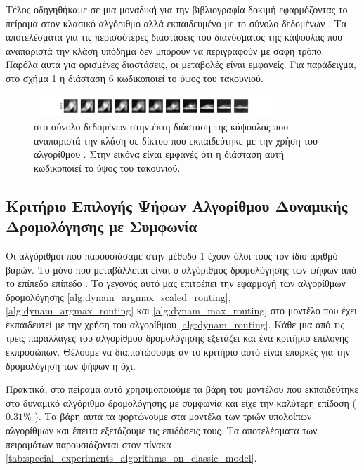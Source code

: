 Τέλος οδηγηθήκαμε σε μια μοναδική για την βιβλιογραφία δοκιμή εφαρμόζοντας το πείραμα στον κλασικό αλγόριθμο αλλά εκπαιδευμένο με το σύνολο δεδομένων . Τα αποτελέσματα για τις περισσότερες διαστάσεις του διανύσματος της κάψουλας που αναπαριστά την κλάση υπόδημα δεν μπορούν να περιγραφούν με σαφή τρόπο. Παρόλα αυτά για ορισμένες διαστάσεις, οι μεταβολές είναι εμφανείς. Για παράδειγμα, στο σχήμα \ref{fig:exp_method_1_special_perturb_4} η διάσταση 6 κωδικοποιεί το ύψος του τακουνιού.
\begin{figure}[h]
    \centering
    \includegraphics[width=0.8\textwidth]{images/chapter experiments/method 1/image 9/perturbations_11_sixth_dim.png}
    \caption{ στο σύνολο δεδομένων  στην έκτη διάσταση της κάψουλας  που αναπαριστά την κλάση  σε δίκτυο που εκπαιδεύτηκε με την χρήση του αλγορίθμου . Στην εικόνα είναι εμφανές ότι η διάσταση αυτή κωδικοποιεί το ύψος του τακουνιού.}
    \label{fig:exp_method_1_special_perturb_4}
  \end{figure}

\subsection{Κριτήριο Επιλογής Ψήφων Αλγορίθμου Δυναμικής Δρομολόγησης με Συμφωνία}

Οι αλγόριθμοι που παρουσιάσαμε στην μέθοδο 1 έχουν όλοι τους τον ίδιο αριθμό βαρών. Το μόνο που μεταβάλλεται είναι ο αλγόριθμος δρομολόγησης των ψήφων από το επίπεδο  επίπεδο . Το γεγονός αυτό μας επιτρέπει την εφαρμογή των αλγορίθμων δρομολόγησης \ref{alg:dynam_argmax_scaled_routing}, \ref{alg:dynam_argmax_routing} και \ref{alg:dynam_max_routing} στο μοντέλο που έχει εκπαιδευτεί με την χρήση του αλγορίθμου \ref{alg:dynam_routing}. Κάθε μια από τις τρείς παραλλαγές του αλγορίθμου δρομολόγησης εξετάζει και ένα κριτήριο επιλογής εκπροσώπων. Θέλουμε να διαπιστώσουμε αν το κριτήριο αυτό είναι επαρκές για την δρομολόγηση των ψήφων ή όχι.\par

Πρακτικά, στο πείραμα αυτό χρησιμοποιούμε τα βάρη του μοντέλου που εκπαιδεύτηκε στο δυναμικό αλγόριθμο δρομολόγησης με συμφωνία και είχε την καλύτερη επίδοση ($0.31\%$ ). Τα βάρη αυτά τα φορτώνουμε στα μοντέλα των τριών υπολοίπων αλγορίθμων και έπειτα εξετάζουμε τις επιδόσεις τους. Τα αποτελέσματα των πειραμάτων παρουσιάζονται στον πίνακα \ref{tab:special_experiments_algorithms_on_classic_model}. \par


